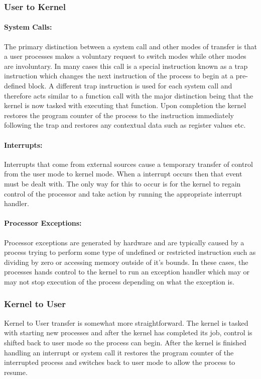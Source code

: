 \documentclass[11pt, letterpaper]{article}
\begin{document}
\subsubsection{User to Kernel}

\paragraph{System Calls:}The primary distinction between a system call and other modes of transfer is that a user processes makes a voluntary request to switch modes while other modes are involuntary. In many cases this call is a special instruction known as a trap instruction which changes the next instruction of the process to begin at a pre-defined block. A different trap instruction is used for each system call and therefore acts similar to a function call with the major distinction being that the kernel is now tasked with executing that function. Upon completion the kernel restores the program counter of the process to the instruction immediately following the trap and restores any contextual data such as register values etc.

\paragraph{Interrupts:}Interrupts that come from external sources cause a temporary transfer of control from the user mode to kernel 
mode. When a interrupt occurs then that event must be dealt with. The only way for this to occur is for the kernel to regain control 
of the processor and take action by running the appropriate interrupt handler. 
\paragraph{Processor Exceptions:} Processor exceptions are generated by hardware and are typically caused by a process trying to 
perform some type of undefined or restricted instruction such as dividing by zero or accessing memory outside of it's bounds. In 
these cases, the processes hands control to the kernel to run an exception handler which may or may not stop execution of the 
process depending on what the exception is.


\subsubsection{Kernel to User}
Kernel to User transfer is somewhat more straightforward. The kernel is tasked with starting new processes and after the kernel has 
completed its job, control is shifted back to user mode so the process can begin. After the kernel is finished handling an 
interrupt or system call it restores the program counter of the interrupted process and switches back to user mode to allow the 
process to resume. 
\end{document}
